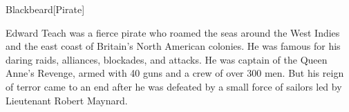 \begin{rpgentity}{Blackbeard}[Pirate]

    Edward Teach was a fierce pirate who roamed the seas around the West Indies and the east coast of Britain's North American colonies. He was famous for his daring raids, alliances, blockades, and attacks. He was captain of the Queen Anne's Revenge, armed with 40 guns and a crew of over 300 men. But his reign of terror came to an end after he was defeated by a small force of sailors led by Lieutenant Robert Maynard.

\end{rpgentity}
